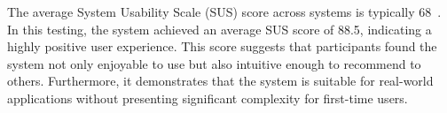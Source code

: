 The average System Usability Scale (SUS) score across systems is typically 68~\cite{babich_sus_usability_website}. In this testing, the system achieved an average SUS score of 88.5, indicating a highly positive user experience. This score suggests that participants found the system not only enjoyable to use but also intuitive enough to recommend to others. Furthermore, it demonstrates that the system is suitable for real-world applications without presenting significant complexity for first-time users.





